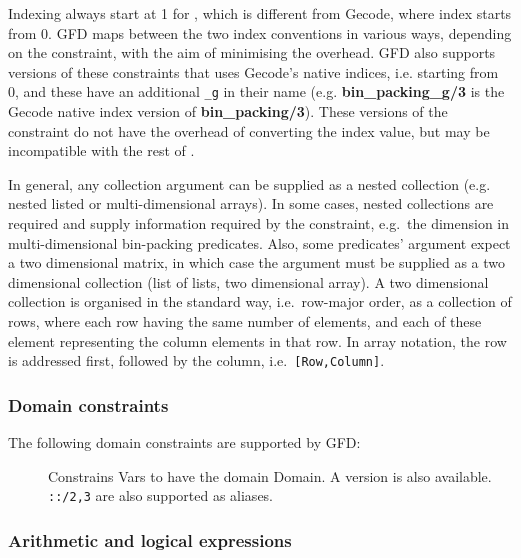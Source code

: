 Indexing always start at 1 for \eclipse, 
which is different from Gecode, where index starts from 0.
GFD maps between the two index conventions in various ways,
depending on the constraint, with the aim of 
minimising the overhead. GFD also supports versions of these constraints that 
uses Gecode's native indices, i.e. starting from 0, and these have an 
additional {\tt _g} in their name (e.g. {\bf bin_packing_g/3} is the Gecode native
index version of {\bf bin_packing/3}). These versions of the constraint do not
have the overhead of converting the index value, but may be
incompatible with the rest of \eclipse.

In general, any collection argument can be supplied as a nested collection
(e.g. nested listed or multi-dimensional arrays). In some
cases, nested collections are required and supply information required
by the constraint, e.g.\ 
the dimension in multi-dimensional bin-packing predicates. Also,
some predicates' argument expect a two dimensional matrix, in which
case the argument must be supplied as a two dimensional collection 
(list of lists, two dimensional array). A two dimensional collection is
organised in the standard \eclipse way, i.e.\ row-major order, as a 
collection of rows, where each row having the same number of elements, and
each of these
element representing the column elements in that row. In array notation,
the row is addressed first, followed by the column, i.e.\  
\verb'[Row,Column]'. 

\subsubsection{Domain constraints}

The following domain constraints are supported by GFD:

\begin{description}
\item[]
Constrains Vars to have the domain Domain. A  version is also available.
\verb'::/2,3' are also supported as aliases.

\end{description}

  
\subsubsection{Arithmetic and logical expressions}

